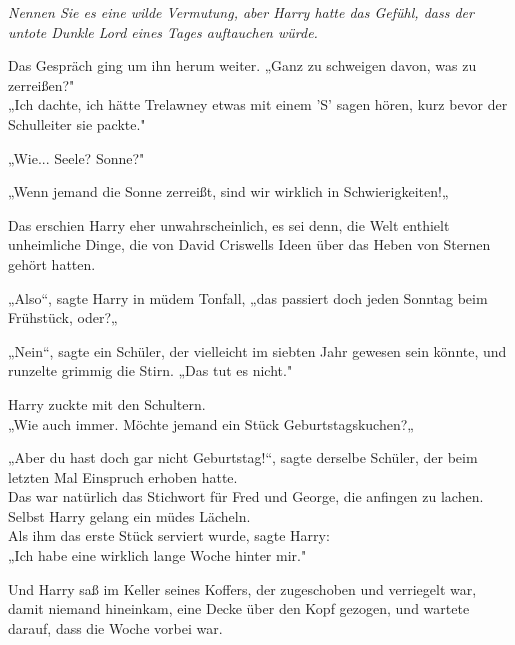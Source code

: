 {\emph{Nennen Sie es eine wilde Vermutung, aber Harry hatte das Gefühl, dass der untote Dunkle Lord eines Tages auftauchen würde.}

Das Gespräch ging um ihn herum weiter. „Ganz zu schweigen davon, was zu zerreißen?"\\ „Ich dachte, ich hätte Trelawney etwas mit einem 'S' sagen hören, kurz bevor der Schulleiter sie packte."

„Wie... Seele? Sonne?"

„Wenn jemand die Sonne zerreißt, sind wir wirklich in Schwierigkeiten!„

Das erschien Harry eher unwahrscheinlich, es sei denn, die Welt enthielt unheimliche Dinge, die von David Criswells Ideen über das Heben von Sternen gehört hatten.

„Also“, sagte Harry in müdem Tonfall, „das passiert doch jeden Sonntag beim Frühstück, oder?„

„Nein“, sagte ein Schüler, der vielleicht im siebten Jahr gewesen sein könnte, und runzelte grimmig die Stirn. „Das tut es nicht."

Harry zuckte mit den Schultern.\\ „Wie auch immer. Möchte jemand ein Stück Geburtstagskuchen?„

„Aber du hast doch gar nicht Geburtstag!“, sagte derselbe Schüler, der beim letzten Mal Einspruch erhoben hatte.\\ Das war natürlich das Stichwort für Fred und George, die anfingen zu lachen.\\ Selbst Harry gelang ein müdes Lächeln.\\ Als ihm das erste Stück serviert wurde, sagte Harry:\\ „Ich habe eine wirklich lange Woche hinter mir."

Und Harry saß im Keller seines Koffers, der zugeschoben und verriegelt war, damit niemand hineinkam, eine Decke über den Kopf gezogen, und wartete darauf, dass die Woche vorbei war.

}
